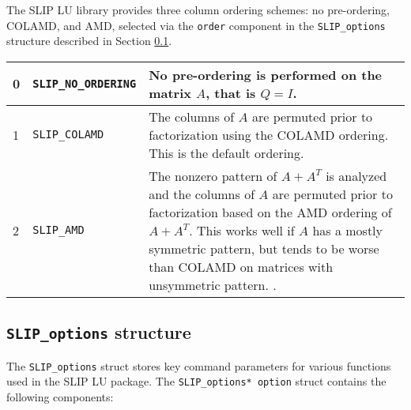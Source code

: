 \documentclass[12pt]{article}
\theoremstyle{definition}
\begin{document}
The SLIP LU library provides three column ordering schemes: no pre-ordering,
COLAMD, and AMD, selected via the \verb|order|
component in the \verb|SLIP_options| structure described in Section
\ref{ss:SLIP_options_struct}.

{\small
\begin{center}
\begin{tabular}{llp{4in}}
\hline
0 & \verb|SLIP_NO_ORDERING| & No pre-ordering is performed on the matrix $A$,
                              that is $Q = I$. \\
\hline
1 & \verb|SLIP_COLAMD|      & The columns of $A$ are permuted prior to
                              factorization using the COLAMD
                              \cite{davis2004algorithmcolamd} ordering.
                              This is the default ordering. \\
\hline
2 & \verb|SLIP_AMD|         & The nonzero pattern of $A + A^T$ is analyzed and
                              the columns of $A$ are permuted prior to
                              factorization based on the AMD
                              \cite{amestoy2004algorithmamd} ordering of
                              $A+A^T$. This works well if $A$ has a mostly
                              symmetric pattern, but tends to be worse
                              than COLAMD on matrices with unsymmetric pattern.
                              \cite{davis2004column}.\\
\hline
\end{tabular}
\label{tab:SLIP_pivot}
\end{center}
}

\cprotect\subsection{ \verb|SLIP_options| structure}
\label{ss:SLIP_options_struct}

The \verb|SLIP_options| struct stores key command parameters for various
functions used in the SLIP LU package. The \verb|SLIP_options* option| struct
contains the following components:
\end{document}
